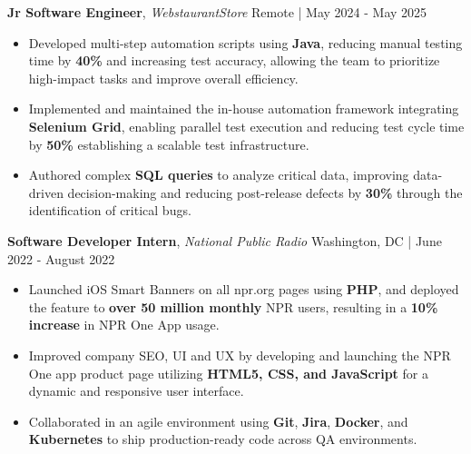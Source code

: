 \documentclass[10pt]{article}
\begin{document}
\textbf{Jr Software Engineer}, \textit{WebstaurantStore} \hfill Remote | May 2024 - May 2025\\
\vspace{-1mm}
\begin{itemize}[leftmargin=5mm, itemsep=0mm]
  
  \item Developed multi-step automation scripts using \textbf{Java}, reducing manual testing time by \textbf{40\%} and increasing test accuracy, allowing the team to prioritize high-impact tasks and improve overall efficiency.
  \item Implemented and maintained the in-house automation framework integrating \textbf{Selenium Grid}, enabling parallel test execution and reducing test cycle time by \textbf{50\%} establishing a scalable test infrastructure.
  \item Authored complex \textbf{SQL queries} to analyze critical data, improving data-driven decision-making and reducing post-release defects by \textbf{30\%} through the identification of critical bugs.
\end{itemize}





\textbf{Software Developer Intern}, \textit{National Public Radio}     \hfill Washington, DC | June 2022 - August 2022\\
\vspace{-1mm}
\begin{itemize}[leftmargin=5mm, itemsep=0mm]
  
  \item Launched iOS Smart Banners on all npr.org pages using \textbf{PHP}, and deployed the feature to \textbf{over 50 million monthly} NPR users, resulting in a \textbf{10\% increase} in NPR One App usage.
  \item Improved company SEO, UI and UX by developing and launching the NPR One app product page utilizing \textbf{HTML5, CSS, and JavaScript} for a dynamic and responsive user interface.
  \item Collaborated in an agile environment using \textbf{Git}, \textbf{Jira}, \textbf{Docker}, and \textbf{Kubernetes} to ship production-ready code across QA environments.
\end{itemize}
\end{document}
